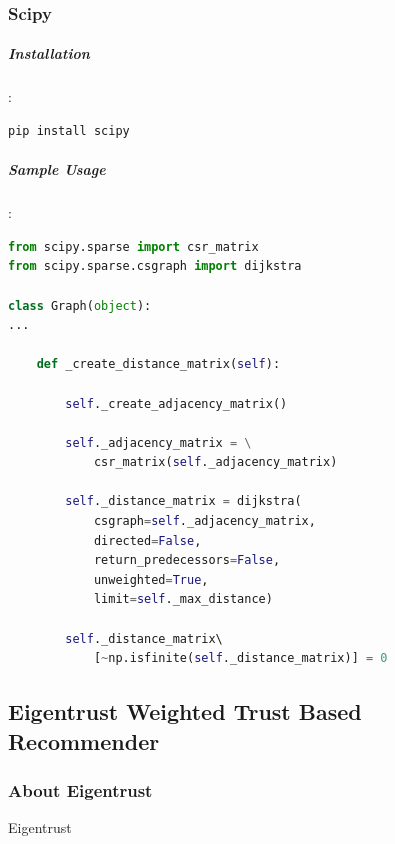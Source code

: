 \documentclass[12pt]{article}
\begin{document}
\subsubsection{Scipy}
\subparagraph{Installation}:
\begin{lstlisting}[language=bash]
pip install scipy
\end{lstlisting}

\subparagraph{Sample Usage}:
\begin{lstlisting}[language=python, caption=Scipy example]
from scipy.sparse import csr_matrix
from scipy.sparse.csgraph import dijkstra

class Graph(object):
...

	def _create_distance_matrix(self):

		self._create_adjacency_matrix()

		self._adjacency_matrix = \
			csr_matrix(self._adjacency_matrix)
		
		self._distance_matrix = dijkstra( 
			csgraph=self._adjacency_matrix, 
			directed=False, 
			return_predecessors=False, 
			unweighted=True,
			limit=self._max_distance)

		self._distance_matrix\ 
			[~np.isfinite(self._distance_matrix)] = 0
\end{lstlisting}


\subsection{Eigentrust Weighted Trust Based Recommender}
\subsubsection{About Eigentrust}
Eigentrust\cite{Eigentrust}
\end{document}
